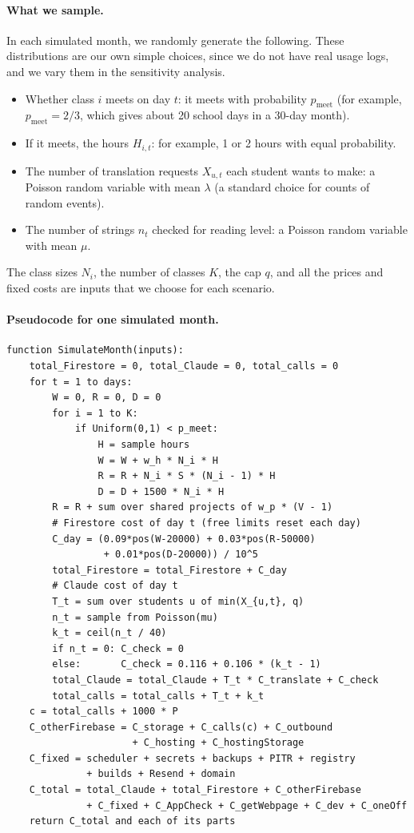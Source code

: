 \documentclass{article}
\begin{document}
\paragraph{What we sample.}
In each simulated month, we randomly generate the following. These distributions are our own simple choices, since we do not have real usage logs, and we vary them in the sensitivity analysis.
\begin{itemize}
    \item Whether class $i$ meets on day $t$: it meets with probability $p_{\text{meet}}$ (for example, $p_{\text{meet}} = 2/3$, which gives about 20 school days in a 30-day month).
    \item If it meets, the hours $H_{i,t}$: for example, 1 or 2 hours with equal probability.
    \item The number of translation requests $X_{u,t}$ each student wants to make: a Poisson random variable with mean $\lambda$ (a standard choice for counts of random events).
    \item The number of strings $n_t$ checked for reading level: a Poisson random variable with mean $\mu$.
\end{itemize}
The class sizes $N_i$, the number of classes $K$, the cap $q$, and all the prices and fixed costs are inputs that we choose for each scenario.

\paragraph{Pseudocode for one simulated month.}
\begin{verbatim}
function SimulateMonth(inputs):
    total_Firestore = 0, total_Claude = 0, total_calls = 0
    for t = 1 to days:
        W = 0, R = 0, D = 0
        for i = 1 to K:
            if Uniform(0,1) < p_meet:
                H = sample hours
                W = W + w_h * N_i * H
                R = R + N_i * S * (N_i - 1) * H
                D = D + 1500 * N_i * H
        R = R + sum over shared projects of w_p * (V - 1)
        # Firestore cost of day t (free limits reset each day)
        C_day = (0.09*pos(W-20000) + 0.03*pos(R-50000)
                 + 0.01*pos(D-20000)) / 10^5
        total_Firestore = total_Firestore + C_day
        # Claude cost of day t
        T_t = sum over students u of min(X_{u,t}, q)
        n_t = sample from Poisson(mu)
        k_t = ceil(n_t / 40)
        if n_t = 0: C_check = 0
        else:       C_check = 0.116 + 0.106 * (k_t - 1)
        total_Claude = total_Claude + T_t * C_translate + C_check
        total_calls = total_calls + T_t + k_t
    c = total_calls + 1000 * P
    C_otherFirebase = C_storage + C_calls(c) + C_outbound
                      + C_hosting + C_hostingStorage
    C_fixed = scheduler + secrets + backups + PITR + registry
              + builds + Resend + domain
    C_total = total_Claude + total_Firestore + C_otherFirebase
              + C_fixed + C_AppCheck + C_getWebpage + C_dev + C_oneOff
    return C_total and each of its parts
\end{verbatim}
\end{document}
